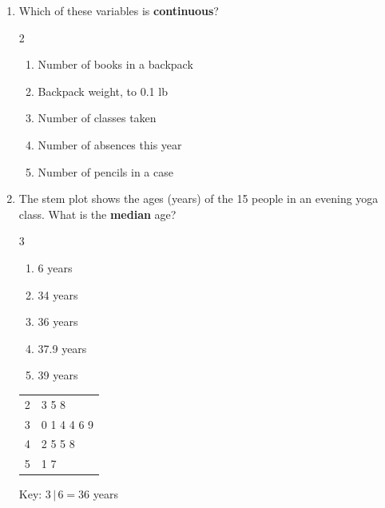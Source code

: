 \documentclass[12pt]{article}
\newenvironment{choices}
  {\begin{enumerate}[label=\textbf{(\Alph*)}, leftmargin=2.2em, itemsep=0pt, topsep=1pt]}
  {\end{enumerate}}
\newcommand{\letterroom}{\rule[-15pt]{0pt}{36pt}}
\begin{document}
\begin{enumerate}[leftmargin=1.9em, itemsep=0.03in]
  \boxguard[8]
  \item Which of these variables is \textbf{continuous}?\hfill{}\letterroom
        \begin{multicols}{2}
        \begin{choices}
          \item Number of books in a backpack
          \item Backpack weight, to 0.1 lb
          \item Number of classes taken
          \item Number of absences this year
          \item Number of pencils in a case
        \end{choices}
        \end{multicols}

  \boxguard[10]
  \item \begin{minipage}[t]{0.62\linewidth}\raggedright
        The stem plot shows the ages (years) of the 15 people in an evening yoga class. What is
        the \textbf{median} age?
        \begin{multicols}{3}
        \begin{choices}
          \item 6 years
          \item 34 years
          \item 36 years
          \item 37.9 years
          \item 39 years
        \end{choices}
        \end{multicols}
        \vspace{0.32in}
        \end{minipage}\hfill
        \begin{minipage}[t]{0.32\linewidth}
        \centering\small
        \begin{tabular}[t]{@{} r | l @{}}
        2 & 3 5 8 \\
        3 & 0 1 4 4 6 9 \\
        4 & 2 5 5 8 \\
        5 & 1 7 \\
        \end{tabular}\par\vspace{2pt}
        {\footnotesize Key: $3\,|\,6 = 36$ years}
        \end{minipage}


\end{enumerate}
\end{document}
